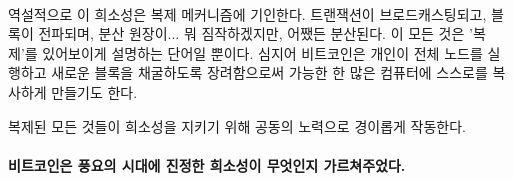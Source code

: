 \paragraph{}
역설적으로 이 희소성은 복제 메커니즘에 기인한다. 
트랜잭션이 브로드캐스팅되고, 블록이 전파되며, 분산 원장이... 뭐 짐작하겠지만, 어쨌든 분산된다.
이 모든 것은 '복제'를 있어보이게 설명하는 단어일 뿐이다.
심지어 비트코인은 개인이 전체 노드를 실행하고 새로운 블록을 채굴하도록 장려함으로써 
가능한 한 많은 컴퓨터에 스스로를 복사하게 만들기도 한다. 

복제된 모든 것들이 희소성을 지키기 위해 공동의 노력으로 경이롭게 작동한다.

\paragraph{비트코인은 풍요의 시대에 진정한 희소성이 무엇인지 가르쳐주었다.}

%
%
%
%
%
%
%
